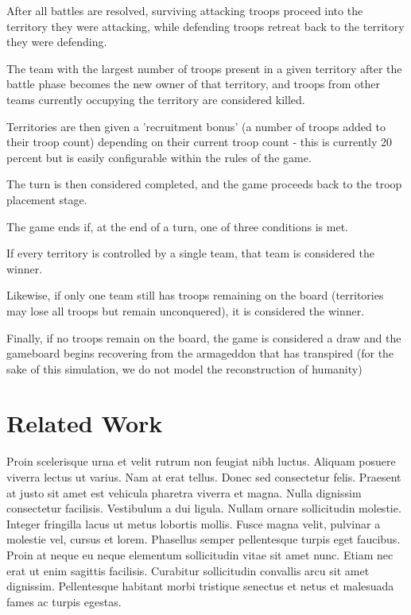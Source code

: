 \documentclass[10pt]{article}
\begin{document}
\begin{multicols}{2}
		After all battles are resolved, surviving attacking troops proceed into the territory they were attacking, while defending troops retreat back to the territory they were defending. 

		The team with the largest number of troops present in a given territory after the battle phase becomes the new owner of that territory, and troops from other teams currently occupying the territory are considered killed.

		Territories are then given a 'recruitment bonus' (a number of troops added to their troop count) depending on their current troop count - this is currently 20 percent but is easily configurable within the rules of the game.

		The turn is then considered completed, and the game proceeds back to the troop placement stage.

		The game ends if, at the end of a turn, one of three conditions is met. 

		If every territory is controlled by a single team, that team is considered the winner. 

		Likewise, if only one team still has troops remaining on the board (territories may lose all troops but remain unconquered), it is considered the winner.

		Finally, if no troops remain on the board, the game is considered a draw and the gameboard begins recovering from the armageddon that has transpired (for the sake of this simulation, we do not model the reconstruction of humanity)

		\section*{Related Work}
		Proin scelerisque urna et velit rutrum non feugiat nibh luctus. Aliquam posuere viverra lectus ut varius. Nam at erat tellus. Donec sed consectetur felis. Praesent at justo sit amet est vehicula pharetra viverra et magna. Nulla dignissim consectetur facilisis. Vestibulum a dui ligula. Nullam ornare sollicitudin molestie. Integer fringilla lacus ut metus lobortis mollis. Fusce magna velit, pulvinar a molestie vel, cursus et lorem. Phasellus semper pellentesque turpis eget faucibus. Proin at neque eu neque elementum sollicitudin vitae sit amet nunc. Etiam nec erat ut enim sagittis facilisis. Curabitur sollicitudin convallis arcu sit amet dignissim. Pellentesque habitant morbi tristique senectus et netus et malesuada fames ac turpis egestas.


\end{multicols}
\end{document}
